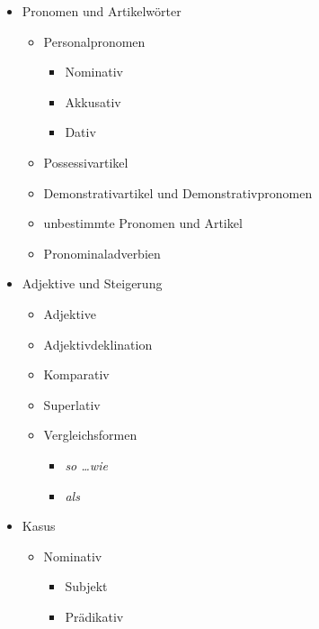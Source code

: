 \documentclass[a4paper]{article}
\begin{document}
\begin{itemize}
            \item Pronomen und Artikelwörter
            \begin{itemize}
                \item Personalpronomen
                \begin{itemize}
                    \item Nominativ
                    \item Akkusativ
                    \item Dativ
                \end{itemize}
                
                \item Possessivartikel
                \item Demonstrativartikel und Demonstrativpronomen
                \item unbestimmte Pronomen und Artikel
                \item Pronominaladverbien
            \end{itemize}
            
            \item Adjektive und Steigerung
            \begin{itemize}
                \item Adjektive
                \item Adjektivdeklination
                \item Komparativ
                \item Superlativ
                \item Vergleichsformen
                \begin{itemize}
                    \item \textit{so \dots wie}
                    \item \textit{als}
                \end{itemize}
            \end{itemize}
            
            \item Kasus
            \begin{itemize}
                \item Nominativ
                \begin{itemize}
                    \item Subjekt
                    \item Prädikativ
                \end{itemize}
                

\end{itemize}
\end{itemize}
\end{document}
